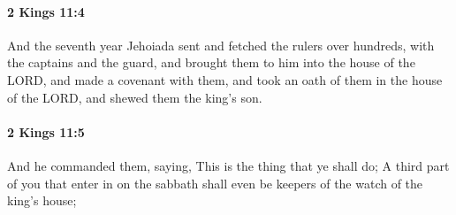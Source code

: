 		\paragraph{2 Kings 11:4} %
			\label{2KINGS-11-4}

			And the seventh year Jehoiada sent and fetched the rulers over hundreds, with the captains and the guard, and brought them to him into the house of the LORD, and made a covenant with them, and took an oath of them in the house of the LORD, and shewed them the king’s son.


		\paragraph{2 Kings 11:5} %
			\label{2KINGS-11-5}

			And he commanded them, saying, This is the thing that ye shall do; A third part of you that enter in on the sabbath shall even be keepers of the watch of the king’s house;

